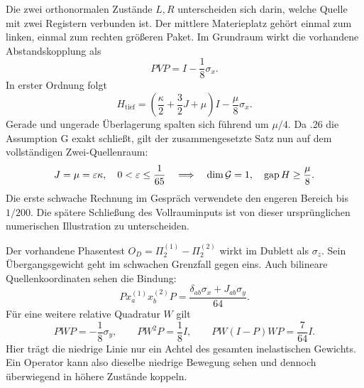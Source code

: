 Die zwei orthonormalen Zustände $L,R$ unterscheiden sich darin, welche Quelle mit zwei Registern verbunden ist. Der mittlere Materieplatz gehört einmal zum linken, einmal zum rechten größeren Paket. Im Grundraum wirkt die vorhandene Abstandskopplung als
\[
 PVP=I-\frac18\sigma_x.
\]
In erster Ordnung folgt
\[
 H_{\mathrm{tief}}=
 \left(\frac\kappa2+\frac32J+\mu\right)I-\frac\mu8\sigma_x.
\]
Gerade und ungerade Überlagerung spalten sich führend um $\mu/4$. Da .26 die Assumption G exakt schließt, gilt der zusammengesetzte Satz nun auf dem vollständigen Zwei-Quellenraum:
\[
 J=\mu=\varepsilon\kappa,\quad0<\varepsilon\le\frac1{65}
 \quad\Longrightarrow\quad\dim\mathcal G=1,\quad\operatorname{gap} H\ge\frac\mu8.
\]
Die erste schwache Rechnung im Gespräch verwendete den engeren Bereich bis $1/200$. Die spätere Schließung des Vollrauminputs ist von dieser ursprünglichen numerischen Illustration zu unterscheiden. 


Der vorhandene Phasentest $O_D=\Pi_2^{(1)}-\Pi_2^{(2)}$ wirkt im Dublett als $\sigma_z$. Sein Übergangsgewicht geht im schwachen Grenzfall gegen eins. Auch bilineare Quellenkoordinaten sehen die Bindung:
\[
 P x_a^{(1)}x_b^{(2)}P
 =\frac{\delta_{ab}\sigma_x+J_{ab}\sigma_y}{64}.
\]
Für eine weitere relative Quadratur $W$ gilt
\[
 PWP=-\frac18\sigma_y,\qquad PW^2P=\frac18I,\qquad
 PW(I-P)WP=\frac7{64}I.
\]
Hier trägt die niedrige Linie nur ein Achtel des gesamten inelastischen Gewichts. Ein Operator kann also dieselbe niedrige Bewegung sehen und dennoch überwiegend in höhere Zustände koppeln. 

